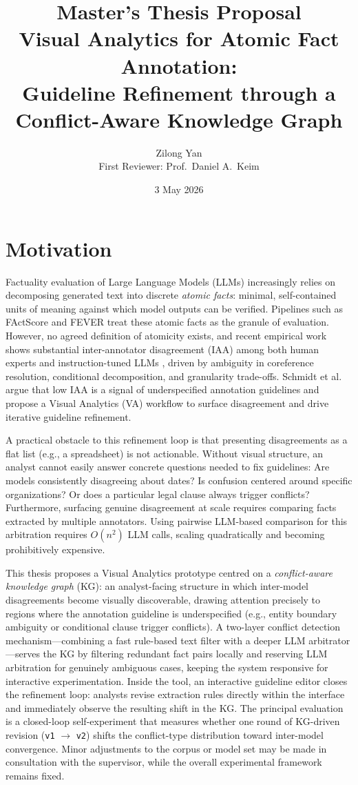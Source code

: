 \documentclass[11pt]{article}
\title{\textbf{Master's Thesis Proposal}\\[0.3em]
Visual Analytics for Atomic Fact Annotation:\\
Guideline Refinement through a Conflict-Aware Knowledge Graph}
\author{Zilong Yan \\[0.2em]
\quad First Reviewer: Prof.\ Daniel A.\ Keim}
\date{3 May 2026}
\begin{document}
\maketitle

\section{Motivation}

Factuality evaluation of Large Language Models (LLMs) increasingly relies on
decomposing generated text into discrete \textit{atomic facts}: minimal,
self-contained units of meaning against which model outputs can be verified.
Pipelines such as FActScore \cite{min2023factscore} and FEVER
\cite{thorne2018fever} treat these atomic facts as the granule of evaluation.
However, no agreed definition of atomicity exists, and recent empirical work
shows substantial inter-annotator disagreement (IAA) among both human experts
and instruction-tuned LLMs \cite{schmidt2025dissecting,wanner2024closer},
driven by ambiguity in coreference resolution, conditional decomposition,
and granularity trade-offs.
Schmidt et al.\ \cite{schmidt2025dissecting}
argue that low IAA is a signal of underspecified annotation guidelines and
propose a Visual Analytics (VA) workflow to surface disagreement and drive
iterative guideline refinement.

A practical obstacle to this refinement loop is that presenting disagreements as a flat list (e.g., a spreadsheet) is not actionable.
Without visual structure, an analyst cannot easily answer concrete questions needed to fix guidelines: Are models consistently disagreeing about dates?
Is confusion centered around specific organizations? Or does a particular legal clause always trigger conflicts?
Furthermore, surfacing genuine disagreement at scale requires comparing facts extracted by multiple annotators.
Using pairwise LLM-based comparison for this arbitration requires $O(n^2)$ LLM calls, scaling quadratically and becoming prohibitively expensive.

This thesis proposes a Visual Analytics prototype centred on a
\textit{conflict-aware knowledge graph} (KG): an analyst-facing structure in
which inter-model disagreements become visually discoverable, drawing
attention precisely to regions where the annotation guideline is
underspecified (e.g., entity boundary ambiguity or conditional clause trigger conflicts).
A two-layer conflict detection mechanism---combining a fast 
rule-based text filter with a deeper LLM arbitrator---serves the KG by
filtering redundant fact pairs locally and reserving LLM arbitration for
genuinely ambiguous cases, keeping the system responsive for
interactive experimentation.
Inside the tool, an interactive 
guideline editor closes the refinement loop: analysts revise extraction rules directly within the interface and immediately observe 
the resulting shift in the KG.
The principal evaluation is a closed-loop 
self-experiment that measures whether one round of KG-driven revision 
(\texttt{v1} $\to$ \texttt{v2}) shifts the conflict-type distribution 
toward inter-model convergence.
Minor adjustments to the corpus or model set may be made in consultation with the supervisor, while the overall experimental framework remains fixed.
\end{document}
